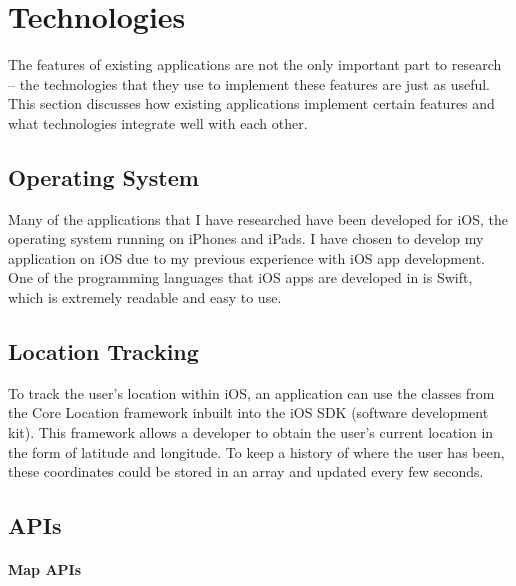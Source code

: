 \section{Technologies}

The features of existing applications are not the only important part to research -- the technologies that they use to implement these features are just as useful. This section discusses how existing applications implement certain features and what technologies integrate well with each other.

\subsection{Operating System}

Many of the applications that I have researched have been developed for iOS, the operating system running on iPhones and iPads. I have chosen to develop my application on iOS due to my previous experience with iOS app development. One of the programming languages that iOS apps are developed in is Swift, which is extremely readable and easy to use.

\subsection{Location Tracking}

To track the user's location within iOS, an application can use the classes from the Core Location framework \cite{AppleInc.} inbuilt into the iOS SDK (software development kit). This framework allows a developer to obtain the user's current location in the form of latitude and longitude. To keep a history of where the user has been, these coordinates could be stored in an array and updated every few seconds.


\subsection{APIs}

\paragraph{Map APIs}\mbox{}\\


